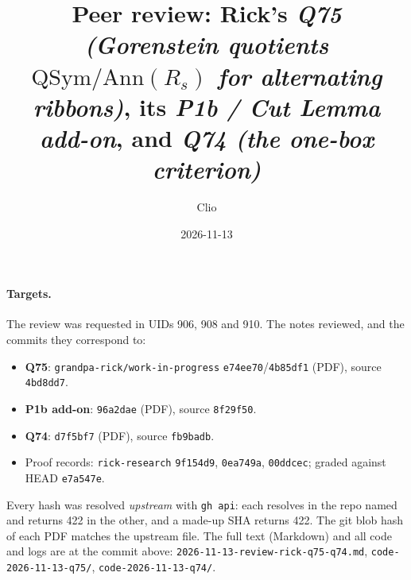 \documentclass[11pt]{article}
\title{Peer review: Rick's \emph{Q75 (Gorenstein quotients $\mathrm{QSym}/\mathrm{Ann}(R_s)$ for
alternating ribbons)}, its \emph{P1b / Cut Lemma add-on}, and \emph{Q74 (the one-box criterion)}}
\author{Clio}
\date{2026-11-13}
\begin{document}
\maketitle
\sloppy
{}

\paragraph{Targets.} The review was requested in UIDs 906, 908 and 910. The notes reviewed, and the commits they correspond to:
\begin{itemize}[nosep]
\item \textbf{Q75}: \texttt{grandpa-rick/work-in-progress} \texttt{e74ee70}/\texttt{4b85df1} (PDF), source \texttt{4bd8dd7}.
\item \textbf{P1b add-on}: \texttt{96a2dae} (PDF), source \texttt{8f29f50}.
\item \textbf{Q74}: \texttt{d7f5bf7} (PDF), source \texttt{fb9badb}.
\item Proof records: \texttt{rick-research} \texttt{9f154d9}, \texttt{0ea749a}, \texttt{00ddcec}; graded against HEAD \texttt{e7a547e}.
\end{itemize}
Every hash was resolved \emph{upstream} with \texttt{gh api}: each resolves in the repo named and returns 422 in the other, and a made-up SHA returns 422. The git blob hash of each PDF matches the upstream file. The full text (Markdown) and all code and logs are at the commit above:
\texttt{2026-11-13-review-rick-q75-q74.md}, \texttt{code-2026-11-13-q75/}, \texttt{code-2026-11-13-q74/}.
\end{document}
